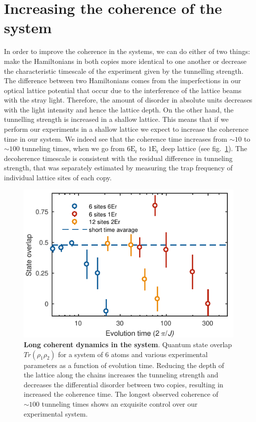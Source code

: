 \section{Increasing the coherence of the system}
In order to improve the coherence in the systems, we can do either of two things: make the Hamiltonians in both copies more identical to one another or decrease the characteristic \linebreak timescale of the experiment given by the tunnelling strength. The difference between two Hamiltonians comes from the imperfections in our optical lattice potential that occur due to the interference of the lattice beams with the stray light. Therefore, the amount of disorder in absolute units decreases with the light intensity and hence the lattice depth. On the other hand, the tunnelling strength is increased in a shallow lattice. This means that if we perform our experiments in a shallow lattice we expect to increase the coherence time in our system. We indeed see that the coherence time increases from $\sim 10$ to $\sim 100$ tunneling times, when we go from $6 \mathrm{E_r}$ to $1 \mathrm{E_r}$ deep lattice (see fig.~\ref{fig:CBH_MBP_long_time}). The decoherence timescale is consistent with the residual difference in tunneling strength, that was separately estimated by measuring the trap frequency of individual lattice sites of each copy. 

\begin{figure}[t]
	\centering
	\includegraphics[scale=1]{figures/CBH_MBP_long_time.pdf}
	\caption{{\bf Long coherent dynamics in the system}. Quantum state overlap $Tr(\rho_1 \rho_2) $ for a system of $6$ atoms and various experimental parameters as a function of evolution time. Reducing the depth of the lattice along the chains increases the tunneling strength and decreases the differential disorder between two copies, resulting in increased the coherence time. The longest observed coherence of $\sim 100$ tunneling times shows an exquisite control over our experimental system.}
	\label{fig:CBH_MBP_long_time}
\end{figure}

